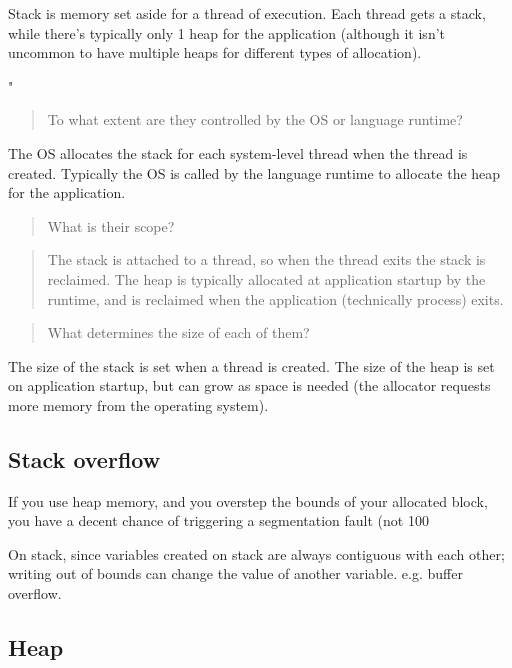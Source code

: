\documentclass[10pt]{amsart}
\begin{document}
\begin{multicols*}{2}
Stack is memory set aside for a thread of execution.  Each thread gets a stack, while there's typically only 1 heap for the application (although it isn't uncommon to have multiple heaps for different types of allocation).  

"
\begin{quotation}
To what extent are they controlled by the OS or language runtime?
\end{quotation}

The OS allocates the stack for each system-level thread when the thread is created. Typically the OS is called by the language runtime to allocate the heap for the application.

\begin{quotation}
What is their scope?
\end{quotation}

\begin{quotation}
The stack is attached to a thread, so when the thread exits the stack is reclaimed. The heap is typically allocated at application startup by the runtime, and is reclaimed when the application (technically process) exits.
\end{quotation}

\begin{quotation}
What determines the size of each of them?
\end{quotation}

The size of the stack is set when a thread is created. The size of the heap is set on application startup, but can grow as space is needed (the allocator requests more memory from the operating system).




\subsection{Stack overflow}  

If you use heap memory, and you overstep the bounds of your allocated block, you have a decent chance of triggering a segmentation fault (not 100%

On stack, since variables created on stack are always contiguous with each other; writing out of bounds can change the value of another variable.  e.g. buffer overflow.  

\subsection{Heap}  


\end{multicols*}
\end{document}
